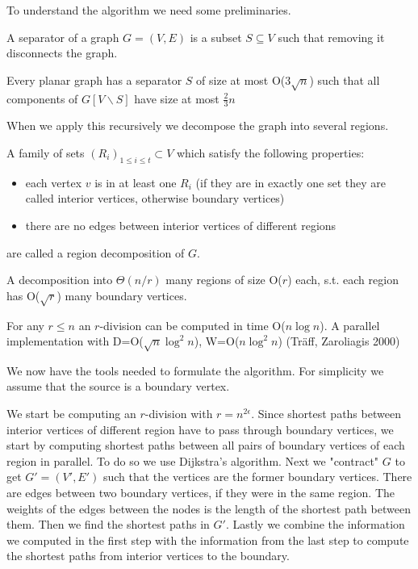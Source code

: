 To understand the algorithm we need some preliminaries.

\begin{Def} A separator of a graph $G=(V,E)$ is a subset $S\subseteq V$ such that removing it disconnects the graph.\end{Def}

\begin{thm} Every planar graph has a separator $S$ of size at most O($3\sqrt n$) such that all components of $G[V\backslash S]$ have size at most $\frac 23 n$\end{thm}

When we apply this recursively we decompose the graph into several regions.

\begin{Def} A family of sets $(R_i)_{1\leq i\leq t} \subset V$ which satisfy the following properties:

\begin{itemize}
\item each vertex $v$ is in at least one $R_i$ (if they are in exactly one set they are called interior vertices, otherwise boundary vertices)
\item there are no edges between interior vertices of different regions
\end{itemize}

are called a region decomposition of $G$.
\end{Def}

\begin{Def}[r-division] A decomposition into $\Theta(n/r)$ many regions of size O($r$) each, s.t. each region has O($\sqrt{r}$) many boundary vertices.
\end{Def}

\begin{thm}[Frederickson 1987] For any $r\leq n$ an $r$-division can be computed in time O($n\log n$). A parallel implementation with D=O($\sqrt n \log^2 n$), W=O($n\log ^2n$) (Träff, Zaroliagis 2000) \end{thm} 

We now have the tools needed to formulate the algorithm. For simplicity we assume that the source is a boundary vertex.

We start be computing an $r$-division with $r=n^{2\epsilon}$. Since shortest paths between interior vertices of different region have to pass through boundary vertices, we start by computing shortest paths between all pairs of boundary vertices of each region in parallel. To do so we use Dijkstra's algorithm. Next we "contract" $G$ to get $G'=(V',E')$ such that the vertices are the former boundary vertices. There are edges between two boundary vertices, if they were in the same region. The weights of the edges between the nodes is the length of the shortest path between them. Then we find the shortest paths in $G'$. Lastly we combine the information we computed in the first step with the information from the last step to compute the shortest paths from interior vertices to the boundary.


